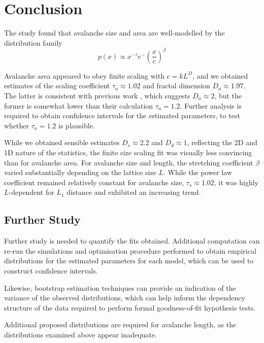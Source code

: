 \chapter{Conclusion}

The study found that avalanche size and area are well-modelled by the distribution family 
\[p(x) \propto x^{-\tau} e^-\left(\frac{x}{c}\right)^\beta\]

Avalanche area appeared to obey finite scaling with $c = k L^D$, and we obtained estimates of the scaling coefficient $\tau_a \approx 1.02$ and fractal dimension $D_a \approx 1.97$. The latter is consistent with previous work \cite{tebaldi1999multifractal}, which suggests $D_a \approx 2$, but the former is somewhat lower than their calculation $\tau_a = 1.2$. Further analysis is required to obtain confidence intervals for the estimated parameters, to test whether $\tau_a=1.2$ is plausible.

While we obtained sensible estimates $D_s \approx 2.2$ and $D_d \approx 1$, reflecting the 2D and 1D nature of the statistics, the finite size scaling fit was visually less convincing than for avalanche area. For avalanche size and length, the stretching coefficient $\beta$ varied substantially depending on the lattice size $L$. While the power law coefficient remained relatively constant for avalanche size, $\tau_s \approx 1.02$, it was highly $L$-dependent for $L_1$ distance and exhibited an increasing trend.

\section{Further Study}
Further study is needed to quantify the fits obtained. Additional computation can re-run the simulations and optimisation procedure performed to obtain empirical distributions for the estimated parameters for each model, which can be used to construct confidence intervals. 

Likewise, bootstrap estimation techniques can provide an indication of the variance of the observed distributions, which can help inform the dependency structure of the data required to perform formal goodness-of-fit hypothesis tests.

Additional proposed distributions are required for avalanche length, as the distributions examined above appear inadequate.

